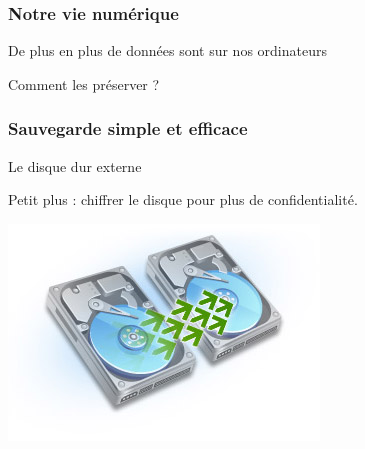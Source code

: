 \documentclass{beamer}
\begin{document}
\begin{frame}
\frametitle{Notre vie numérique}

\begin{block}{De plus en plus de données sont sur nos ordinateurs}
\begin{itemize}
\end{itemize}
Comment les préserver ?
\end{block}
\end{frame}


\begin{frame}
\frametitle{Sauvegarde simple et efficace}

\begin{block}{Le disque dur externe}
\begin{itemize}
\end{itemize}
Petit plus : chiffrer le disque pour plus de confidentialité.
\end{block}
\begin{center}
\includegraphics[scale=0.5] {./images/backup.jpg}
\end{center}

\end{frame}
\end{document}
